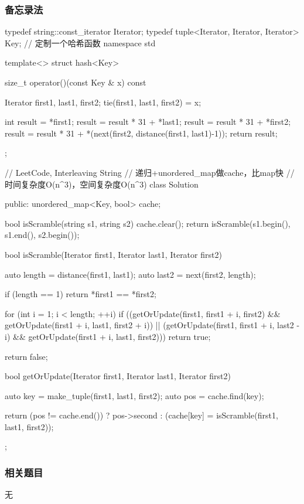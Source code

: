 \subsubsection{备忘录法}
\begin{Code}
typedef string::const_iterator Iterator;
typedef tuple<Iterator, Iterator, Iterator> Key;
// 定制一个哈希函数
namespace std {
template<> struct hash<Key> {
    size_t operator()(const Key & x) const {
        Iterator first1, last1, first2;
        tie(first1, last1, first2) = x;

        int result = *first1;
        result = result * 31 + *last1;
        result = result * 31 + *first2;
        result = result * 31 + *(next(first2, distance(first1, last1)-1));
        return result;
    }
};
}

// LeetCode, Interleaving String
// 递归+unordered_map做cache，比map快
// 时间复杂度O(n^3)，空间复杂度O(n^3)
class Solution {
public:
    unordered_map<Key, bool> cache;

    bool isScramble(string s1, string s2) {
        cache.clear();
        return isScramble(s1.begin(), s1.end(), s2.begin());
    }

    bool isScramble(Iterator first1, Iterator last1, Iterator first2) {
        auto length = distance(first1, last1);
        auto last2 = next(first2, length);

        if (length == 1)
            return *first1 == *first2;

        for (int i = 1; i < length; ++i)
            if ((getOrUpdate(first1, first1 + i, first2)
                    && getOrUpdate(first1 + i, last1, first2 + i))
                    || (getOrUpdate(first1, first1 + i, last2 - i)
                            && getOrUpdate(first1 + i, last1, first2)))
                return true;

        return false;
    }

    bool getOrUpdate(Iterator first1, Iterator last1, Iterator first2) {
        auto key = make_tuple(first1, last1, first2);
        auto pos = cache.find(key);

        return (pos != cache.end()) ?
                pos->second : (cache[key] = isScramble(first1, last1, first2));
    }
};
\end{Code}


\subsubsection{相关题目}
\begindot
\item 无
\myenddot


